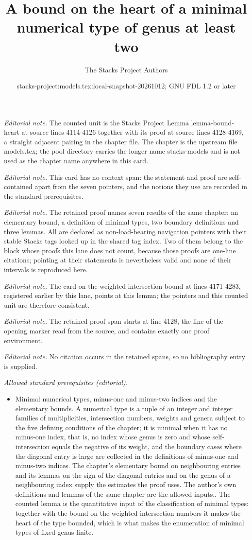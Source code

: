 \documentclass[10pt,a4paper]{amsart}
\title{A bound on the heart of a minimal numerical type of genus at least two}
\author{The Stacks Project Authors}
\date{stacks-project:models.tex:local-snapshot-20261012; GNU FDL 1.2 or later}
\theoremstyle{plain}
\theoremstyle{definition}
\theoremstyle{remark}
\numberwithin{equation}{subsection}
\begin{document}
\maketitle
\noindent\textit{Editorial note.} The counted unit is the Stacks Project Lemma lemma-bound-heart at source lines 4114-4126 together with its proof at source lines 4128-4169, a straight adjacent pairing in the chapter file. The chapter is the upstream file models.tex; the pool directory carries the longer name stacks-models and is not used as the chapter name anywhere in this card.\par\medskip
\noindent\textit{Editorial note.} This card has no context span: the statement and proof are self-contained apart from the seven pointers, and the notions they use are recorded in the standard prerequisites.\par\medskip
\noindent\textit{Editorial note.} The retained proof names seven results of the same chapter: an elementary bound, a definition of minimal types, two boundary definitions and three lemmas. All are declared as non-load-bearing navigation pointers with their stable Stacks tags looked up in the shared tag index. Two of them belong to the block whose proofs this lane does not count, because those proofs are one-line citations; pointing at their statements is nevertheless valid and none of their intervals is reproduced here.\par\medskip
\noindent\textit{Editorial note.} The card on the weighted intersection bound at lines 4171-4283, registered earlier by this lane, points at this lemma; the pointers and this counted unit are therefore consistent.\par\medskip
\noindent\textit{Editorial note.} The retained proof span starts at line 4128, the line of the opening marker read from the source, and contains exactly one proof environment.\par\medskip
\noindent\textit{Editorial note.} No citation occurs in the retained spans, so no bibliography entry is supplied.\par\medskip
\noindent\textit{Allowed standard prerequisites (editorial).}\begin{itemize}
\item Minimal numerical types, minus-one and minus-two indices and the elementary bounds. A numerical type is a tuple of an integer and integer families of multiplicities, intersection numbers, weights and genera subject to the five defining conditions of the chapter; it is minimal when it has no minus-one index, that is, no index whose genus is zero and whose self-intersection equals the negative of its weight, and the boundary cases where the diagonal entry is large are collected in the definitions of minus-one and minus-two indices. The chapter's elementary bound on neighbouring entries and its lemmas on the sign of the diagonal entries and on the genus of a neighbouring index supply the estimates the proof uses. The author's own definitions and lemmas of the same chapter are the allowed inputs.. The counted lemma is the quantitative input of the classification of minimal types: together with the bound on the weighted intersection numbers it makes the heart of the type bounded, which is what makes the enumeration of minimal types of fixed genus finite.
\end{itemize}\medskip
\end{document}
